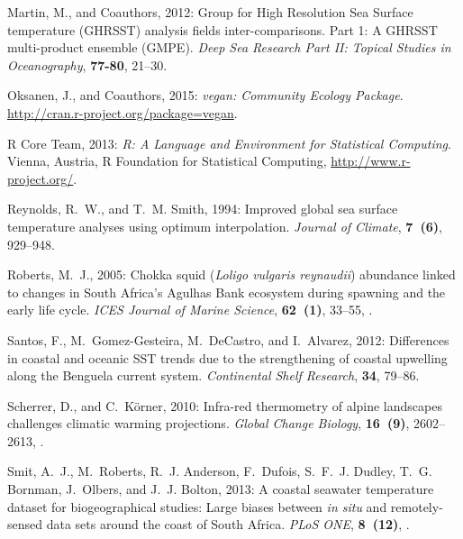 \documentclass{ametsoc}
\begin{document}
\begin{thebibliography}{23}
Martin, M., and Coauthors, 2012: {Group for High Resolution Sea Surface
  temperature (GHRSST) analysis fields inter-comparisons. Part 1: A GHRSST
  multi-product ensemble (GMPE)}. \textit{Deep Sea Research Part II: Topical
  Studies in Oceanography}, \textbf{77-80}, 21--30.

Oksanen, J., and Coauthors, 2015: \textit{{vegan: Community Ecology Package}}.
  \urlprefix\url{http://cran.r-project.org/package=vegan}.

{R Core Team}, 2013: \textit{{R: A Language and Environment for Statistical
  Computing}}. Vienna, Austria, R Foundation for Statistical Computing,
  \urlprefix\url{http://www.r-project.org/}.

Reynolds, R.~W., and T.~M. Smith, 1994: {Improved global sea surface
  temperature analyses using optimum interpolation}. \textit{Journal of
  Climate}, \textbf{7~(6)}, 929--948.

Roberts, M.~J., 2005: {Chokka squid (\textit{Loligo vulgaris reynaudii}) abundance
  linked to changes in South Africa's Agulhas Bank ecosystem during spawning
  and the early life cycle}. \textit{ICES Journal of Marine Science},
  \textbf{62~(1)}, 33--55, .

Santos, F., M.~Gomez-Gesteira, M.~DeCastro, and I.~Alvarez, 2012: {Differences
  in coastal and oceanic SST trends due to the strengthening of coastal
  upwelling along the Benguela current system}. \textit{Continental Shelf
  Research}, \textbf{34}, 79--86.

Scherrer, D., and C.~K{\"{o}}rner, 2010: {Infra-red thermometry of alpine
  landscapes challenges climatic warming projections}. \textit{Global Change
  Biology}, \textbf{16~(9)}, 2602--2613,
  .

Smit, A.~J., M.~Roberts, R.~J. Anderson, F.~Dufois, S.~F.~J. Dudley, T.~G.
  Bornman, J.~Olbers, and J.~J. Bolton, 2013: {A coastal seawater temperature
  dataset for biogeographical studies: Large biases between \textit{in situ} and
  remotely-sensed data sets around the coast of South Africa}. \textit{PLoS
  ONE}, \textbf{8~(12)}, .


\end{thebibliography}
\end{document}
